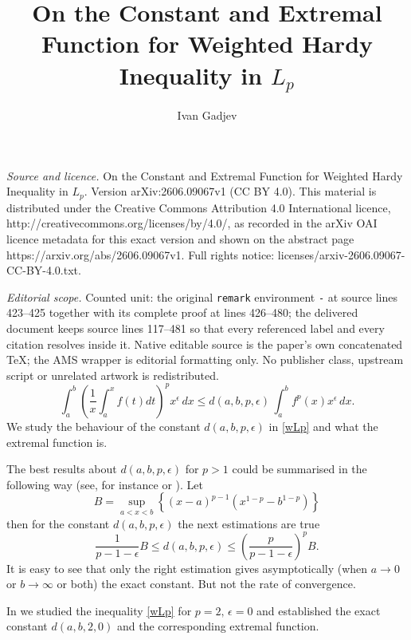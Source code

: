 \documentclass[10pt,a4paper]{amsart}
\numberwithin{equation}{section}
\begin{document}
\title[On the Constant and Extremal Function for Weighted Hardy Ine]{On the Constant and Extremal Function for Weighted Hardy Inequality in $L_p$}
\author{Ivan Gadjev}
\date{}
\maketitle
\noindent\emph{Source and licence.} On the Constant and Extremal Function for Weighted Hardy Inequality in $L_p$. Version arXiv:2606.09067v1 (CC BY 4.0). This material is distributed under the Creative Commons Attribution 4.0 International licence, http://creativecommons.org/licenses/by/4.0/, as recorded in the arXiv OAI licence metadata for this exact version and shown on the abstract page https://arxiv.org/abs/2606.09067v1. Full rights notice: licenses/arxiv-2606.09067-CC-BY-4.0.txt.\par\smallskip
\noindent\textit{Editorial scope.} Counted unit: the original \texttt{remark} environment \texttt{-} at source lines 423--425 together with its complete proof at lines 426--480; the delivered document keeps source lines 117--481 so that every referenced label and every citation resolves inside it. Native editable source is the paper's own concatenated TeX; the AMS wrapper is editorial formatting only. No publisher class, upstream script or unrelated artwork is redistributed.
 \begin{equation}\label{wLp}
\int_a^b\left(\frac{1}{x}\int_a^xf(t)dt\right)^px^\epsilon\,dx\leq
d(a,b,p,\epsilon)\,\int_a^b f^p(x)x^\epsilon\, dx.
\end{equation}
We study the behaviour of the constant $d(a,b,p,\epsilon)$ in \eqref{wLp} and what the extremal function is.

The best results about $d(a,b,p,\epsilon)$ for $p>1$ could be summarised in the following way
(see, for instance \cite{KMP2007} or \cite{KP2003}).
Let
\[
B=\sup_{a<x<b} \left\{(x-a)^{p-1}\left(x^{1-p}-b^{1-p} \right)\right\}
\]
then for the constant $d(a,b,p,\epsilon)$ the next estimations are true
\[
\frac{1}{p-1-\epsilon}B\le d(a,b,p,\epsilon) \le \left(\frac{p}{p-1-\epsilon} \right)^p B.
\]
It is easy to see that only the right estimation gives asymptotically (when $a\rightarrow 0$ or $b\rightarrow \infty$ or both) the exact constant. But not the rate of convergence.

In \cite{DGM} we studied the inequality \eqref{wLp} for $p=2, \,\epsilon=0$ and established the exact constant $d(a,b,2,0)$ and the corresponding extremal function.
\end{document}
